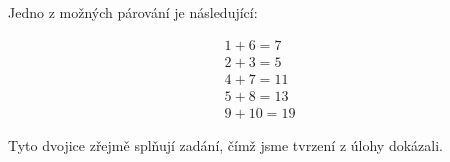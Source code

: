 \documentclass{fkssolpub}
\author{Ondřej Sedláček}
\begin{document}
 

Jedno z možných párování je následující:

\begin{gather*}
  1 + 6 = 7  \\
  2 + 3 = 5  \\
  4 + 7 = 11  \\
  5 + 8 = 13  \\
  9 + 10 = 19 
\end{gather*}

Tyto dvojice zřejmě splňují zadání, čímž jsme tvrzení z úlohy
dokázali.
\end{document}
